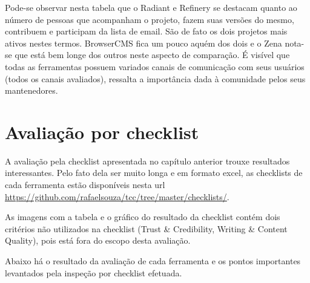 Pode-se observar nesta tabela que o Radiant e Refinery se destacam quanto ao número de pessoas que acompanham o projeto, fazem suas versões do mesmo, contribuem e participam da lista de email. São de fato os dois projetos mais ativos nestes termos. BrowserCMS fica um pouco aquém dos dois e o Zena nota-se que está bem longe dos outros neste aspecto de comparação. É visível que todas as ferramentas possuem variados canais de comunicação com seus usuários (todos os canais avaliados), ressalta a importância dada à comunidade pelos seus mantenedores.

\section{Avaliação por checklist}

A avaliação pela checklist apresentada no capítulo anterior trouxe resultados interessantes. Pelo fato dela ser muito longa e em formato excel, as checklists de cada ferramenta estão disponíveis nesta url \url{https://github.com/rafaelsouza/tcc/tree/master/checklists/}. 

As imagens com a tabela e o gráfico do resultado da checklist contém dois critérios não utilizados na checklist (Trust \& Credibility, Writing \& Content Quality), pois está fora do escopo desta avaliação.

Abaixo há o resultado da avaliação de cada ferramenta e os pontos importantes levantados pela inspeção por checklist efetuada.






